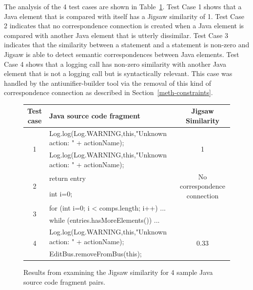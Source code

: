 The analysis of the 4 test cases are shown in Table~\ref{jigsaw_4_test_cases}. Test Case 1 shows that a Java element that is compared with itself has a Jigsaw similarity of 1. Test Case 2 indicates that no correspondence connection is created when a Java element is compared with another Java element that is utterly dissimilar. Test Case 3 indicates that the similarity between a  statement and a  statement is non-zero and Jigsaw is able to detect semantic correspondences between Java elements. Test Case 4 shows that a logging call has non-zero similarity with another Java element that is not a logging call but is syntactically relevant. This case was handled by the antiunifier-builder tool via the removal of this kind of correspondence connection as described in  Section~\ref{meth-constraints}.

\begin{figure}
  \centering
  \begin{tabular}{|c|l|c|}
    \hline
    Test case & Java source code fragment & Jigsaw Similarity\\
    \hline

    \multirow{2}{*}{{1}}&Log.log(Log.WARNING,this,"Unknown action: " + actionName);& \multirow{2}{*}{1}\\
    \cline{2-2}
                         &Log.log(Log.WARNING,this,"Unknown action: " + actionName);\\
    \hline

       \multirow{2}{*}{2}&return entry& \multirow{2}{*}{ No correspondence connection}\\
    \cline{2-2}
       &int i=0;\\
    \hline


 \multirow{2}{*}{3}&
 for (int i=0; i < comps.length; i++) {...} \\


    \cline{2-2}
      &
while (entries.hasMoreElements())  { ...}
      \\
    \hline

    \multirow{2}{*}{4}&Log.log(Log.WARNING,this,"Unknown action: " + actionName);& \multirow{2}{*}{0.33}\\
    \cline{2-2}
      &EditBus.removeFromBus(this);\\
    \hline

  \end{tabular}
  \caption{Results from examining the Jigsaw similarity for 4 sample Java source code fragment pairs.}
  \label{jigsaw_4_test_cases}
\end{figure}



